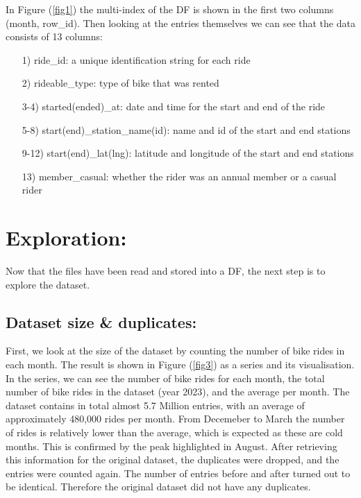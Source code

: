 \documentclass[12pt]{article}
\begin{document}
	In Figure (\underline{\ref{fig1}}) the multi-index of the DF is shown in the first two columns (month, row\_id). Then looking at the entries themselves we can see that the data consists of 13 columns: 
	\begin{itemize}
	\item [1)] ride\_id: a unique identification string for each ride
	\item [2)] rideable\_type: type of bike that was rented
	\item [3-4)] started(ended)\_at: date and time for the start and end of the ride
	\item [5-8)]  start(end)\_station\_name(id): name and id of the start and end stations
	\item [9-12)] start(end)\_lat(lng): latitude and longitude of the start and end stations
	\item [13)] member\_casual: whether the rider was an annual member or a casual rider 
	\end{itemize}

\section{Exploration:}
Now that the files have been read and stored into a DF, the next step is to explore the dataset.
 
\subsection{Dataset size \& duplicates:}
First, we look at the size of the dataset by counting the number of bike rides in each month. The result is shown in Figure (\underline{\ref{fig3}}) as a series and its visualisation. In the series, we can see the number of bike rides for each month, the total number of bike rides in the dataset (year 2023), and the average per month. The dataset contains in total almost 5.7 Million entries, with an average of approximately 480,000 rides per month. From Decemeber to March the number of rides is relatively lower than the average, which is expected as these are cold months. This is confirmed by the peak highlighted in August. After retrieving this information for the original dataset, the duplicates were dropped, and the entries were counted again. The number of entries before and after turned out to be identical. Therefore the original dataset did not have any duplicates.\\ 
	
	
\end{document}
